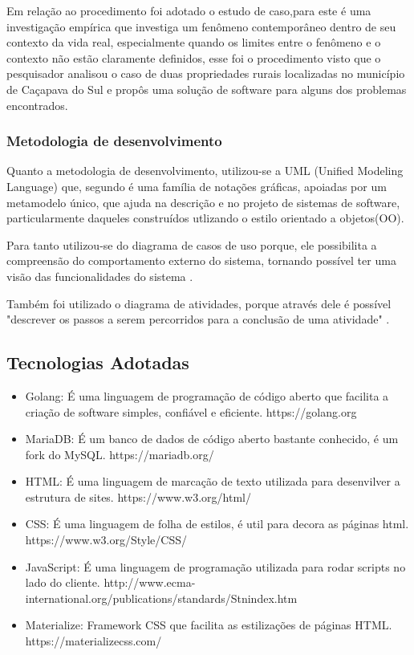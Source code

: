 \documentclass[12pt]{article}
\begin{document}
	Em relação ao procedimento foi adotado o estudo de caso,para  este é uma investigação empírica que investiga um fenômeno contemporâneo dentro de seu contexto da vida real, especialmente quando os limites entre o fenômeno e o contexto não estão claramente definidos, esse foi o procedimento visto que o pesquisador analisou o caso de duas propriedades rurais localizadas no município de Caçapava do Sul e propôs uma solução de software para alguns dos problemas encontrados.

	\subsubsection{Metodologia de desenvolvimento}
    
    Quanto a metodologia de desenvolvimento, utilizou-se a UML (Unified Modeling Language) que, segundo  é uma família de notações gráficas, apoiadas por um metamodelo único, que ajuda na descrição e no projeto de sistemas de software, particularmente daqueles construídos utlizando o estilo orientado a objetos(OO).
    
    Para tanto utilizou-se do diagrama de casos de uso porque, ele possibilita a compreensão do comportamento externo do sistema, tornando possível ter uma visão das funcionalidades do sistema \cite{guedes18}.
    
    Também foi utilizado o diagrama de atividades, porque através dele é possível "descrever os passos a serem percorridos para a conclusão de uma atividade" \cite{guedes18}.

	\subsection{Tecnologias Adotadas}

	\begin{itemize}
		\item Golang: É uma linguagem de programação de código aberto que facilita a criação de software simples, confiável e eficiente. https://golang.org	
		\item MariaDB: É um banco de dados de código aberto bastante conhecido, é um fork do MySQL. https://mariadb.org/
		\item HTML: É uma linguagem de marcação de texto utilizada para desenvilver a estrutura de sites. https://www.w3.org/html/
		\item CSS: É uma linguagem de folha de estilos, é util para decora as páginas html. https://www.w3.org/Style/CSS/
		\item JavaScript: É uma linguagem de programação utilizada para rodar scripts no lado do cliente. http://www.ecma-international.org/publications/standards/Stnindex.htm
		\item Materialize: Framework CSS que facilita as estilizações de páginas HTML. https://materializecss.com/
	\end{itemize}
\end{document}
